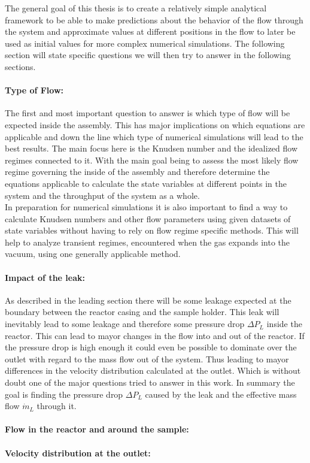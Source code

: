 
	The general goal of this thesis is to create a relatively simple analytical framework to be able to make predictions about the behavior of the flow through the system and approximate values at different positions in the flow to later be used as initial values for more complex numerical simulations.
	The following section will state specific questions we will then try to answer in the following sections.
	
\paragraph{Type of Flow:}

	The first and most important question to answer is which type of flow will be expected inside the assembly.
	This has major implications on which equations are applicable and down the line which type of numerical simulations will lead to the best results.
	The main focus here is the Knudsen number and the idealized flow regimes connected to it.
	With the main goal being to assess the most likely flow regime governing the inside of the assembly and therefore determine the equations applicable to calculate the state variables at different points in the system and the throughput of the system as a whole.\\
	In preparation for numerical simulations it is also important to find a way to calculate Knudsen numbers and other flow parameters using given datasets of state variables without having to rely on flow regime specific methods. This will help to analyze transient regimes, encountered when the gas expands into the vacuum, using one generally applicable method.  

\paragraph{Impact of the leak:}

	As described in the leading section there will be some leakage expected at the boundary between the reactor casing and the sample holder.
	This leak will inevitably lead to some leakage and therefore some pressure drop $\Delta P_L$ inside the reactor.
	This can lead to mayor changes in the flow into and out of the reactor.
	If the pressure drop is high enough it could even be possible to dominate over the outlet with regard to the mass flow out of the system.
	Thus leading to mayor differences in the velocity distribution calculated at the outlet.
	Which is without doubt one of the major questions tried to answer in this work.
	In summary the goal is finding the pressure drop $\Delta P_L$ caused by the leak and the effective mass flow $\dot{m}_L$ through it.
	
\paragraph{Flow in the reactor and around the sample:}

\paragraph{Velocity distribution at the outlet:}
